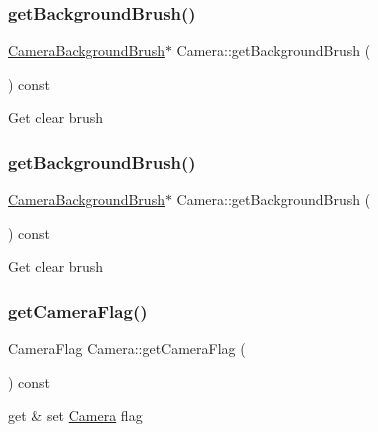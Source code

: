 \subsubsection{\texorpdfstring{get\+Background\+Brush()}{getBackgroundBrush()}\hspace{0.1cm}{\footnotesize\ttfamily [1/2]}}
{\footnotesize\ttfamily \hyperlink{classCameraBackgroundBrush}{Camera\+Background\+Brush}$\ast$ Camera\+::get\+Background\+Brush (\begin{DoxyParamCaption}{ }\end{DoxyParamCaption}) const\hspace{0.3cm}{\ttfamily [inline]}}

Get clear brush \mbox{\label{classCamera_a7994f962fbded68295f7b15f3046bdd8}} 
\subsubsection{\texorpdfstring{get\+Background\+Brush()}{getBackgroundBrush()}\hspace{0.1cm}{\footnotesize\ttfamily [2/2]}}
{\footnotesize\ttfamily \hyperlink{classCameraBackgroundBrush}{Camera\+Background\+Brush}$\ast$ Camera\+::get\+Background\+Brush (\begin{DoxyParamCaption}{ }\end{DoxyParamCaption}) const\hspace{0.3cm}{\ttfamily [inline]}}

Get clear brush \mbox{\label{classCamera_ae7a648c0780484ba413a6197a489f208}} 
\subsubsection{\texorpdfstring{get\+Camera\+Flag()}{getCameraFlag()}\hspace{0.1cm}{\footnotesize\ttfamily [1/2]}}
{\footnotesize\ttfamily Camera\+Flag Camera\+::get\+Camera\+Flag (\begin{DoxyParamCaption}{ }\end{DoxyParamCaption}) const\hspace{0.3cm}{\ttfamily [inline]}}

get \& set \hyperlink{classCamera}{Camera} flag \mbox{\label{classCamera_ae7a648c0780484ba413a6197a489f208}} 
